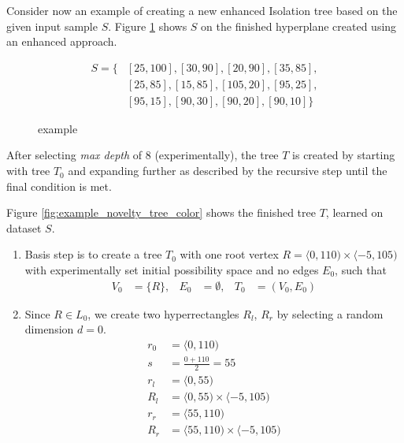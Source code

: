 \begin{example}
\label{example:novelty_tree_create}
Consider now an example of creating a new enhanced Isolation tree based on the given input sample $S$. Figure \ref{fig:example_novelty_gnu} shows $S$ on the finished hyperplane created using an enhanced approach.

\begin{align*}
    S = \{&[25,100],[30,90],[20,90],[35,85],\\
    &[25,85],[15,85],[105,20],[95,25], \\
    &[95,15],[90,30],[90,20],[90,10]\}
\end{align*}


\begin{figure}[htbp]
\centering

\caption{example}
\label{fig:example_novelty_gnu}
\end{figure}

After selecting \emph{max depth} of 8 (experimentally), the tree $T$ is created by starting with tree $T_0$ and expanding further as described by the recursive step until the final condition is met.

Figure \ref{fig:example_novelty_tree_color} shows the finished tree $T$, learned on dataset $S$.

\begin{enumerate}
    \item Basis step is to create a tree $T_0$ with one root vertex $R = \langle 0,110) \times \langle -5,105)$ with experimentally set initial possibility space and no edges $E_0$, such that
    \begin{align*}
        V_0 &= \{R\},&
        E_0 &= \emptyset,&
        T_0 &= (V_0, E_0)
    \end{align*}
    \item Since $R \in L_0$, we create two hyperrectangles $R_l$, $R_r$ by selecting a random dimension $d=0$.
    \begin{align*}
        r_0 &= \langle 0, 110) \\
        s &= \frac{0 + 110}{2} = 55 \\
        r_l &= \langle 0, 55) \\
        R_l &= \langle 0, 55) \times \langle -5,105) \\
        r_r &= \langle 55, 110) \\
        R_r &= \langle 55, 110) \times \langle -5,105)
    \end{align*}


\end{enumerate}
\end{example}
